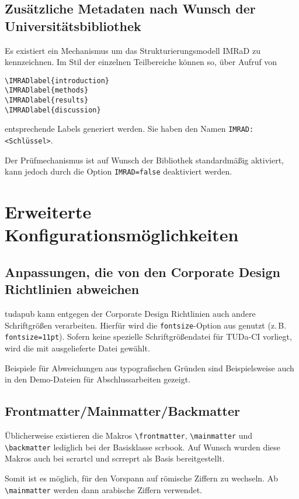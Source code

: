 \documentclass[
	ngerman,
	accentcolor=9c,%
	]{tudapub}
\let\code\texttt
\let\cls\textsf
\begin{document}
\subsection{Zusätzliche Metadaten nach Wunsch der Universitätsbibliothek}
\label{sec:IMRAD}
Es existiert ein Mechanismus um das Strukturierungsmodell IMRaD \cite{imrad} zu kennzeichnen.
Im Stil der einzelnen Teilbereiche können so, über Aufruf von

\begin{verbatim}
\IMRADlabel{introduction}
\IMRADlabel{methods}
\IMRADlabel{results}
\IMRADlabel{discussion}
\end{verbatim}
entsprechende Labels generiert werden. Sie haben den Namen \code{IMRAD:<Schlüssel>}.

Der Prüfmechanismus ist auf Wunsch der Bibliothek standardmäßig aktiviert, kann jedoch durch die Option \code{IMRAD=false} deaktiviert werden.


\section{Erweiterte Konfigurationsmöglichkeiten}


\subsection{Anpassungen, die von den Corporate Design Richtlinien abweichen}
\cls{tudapub} kann entgegen der Corporate Design Richtlinien auch andere Schriftgrößen verarbeiten. Hierfür wird die \code{fontsize}-Option aus \KOMAScript{} genutzt (z.\,B. \code{fontsize=11pt}). Sofern keine spezielle Schriftgrößendatei für TUDa-CI vorliegt, wird die mit \KOMAScript{} ausgelieferte Datei gewählt.

Beispiele für Abweichungen aus typografischen Gründen sind Beispielsweise auch in den Demo-Dateien für Abschlussarbeiten gezeigt.

\subsection{Frontmatter/Mainmatter/Backmatter}
Üblicherweise existieren die Makros \verb+\frontmatter+, \verb+\mainmatter+ und \verb+\backmatter+ lediglich bei der Basisklasse \cls{scrbook}.
Auf Wunsch wurden diese Makros auch bei \cls{scrartcl} und \cls{scrreprt} als Basis bereitgestellt.

Somit ist es möglich, für den Vorspann auf römische Ziffern zu wechseln. Ab \verb+\mainmatter+ werden dann arabische Ziffern verwendet.
\end{document}
